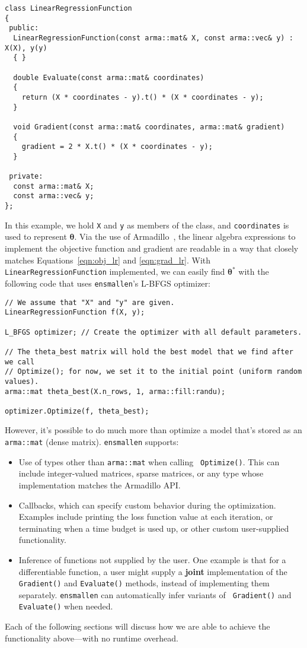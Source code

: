 \begin{verbatim}
class LinearRegressionFunction
{
 public:
  LinearRegressionFunction(const arma::mat& X, const arma::vec& y) : X(X), y(y)
  { }

  double Evaluate(const arma::mat& coordinates)
  {
    return (X * coordinates - y).t() * (X * coordinates - y);
  }

  void Gradient(const arma::mat& coordinates, arma::mat& gradient)
  {
    gradient = 2 * X.t() * (X * coordinates - y);
  }

 private:
  const arma::mat& X;
  const arma::vec& y;
};
\end{verbatim}

In this example, we hold {\tt \small X} and {\tt \small y} as members of the
class, and {\tt \small coordinates} is used to represent $\bm \theta$.  Via the
use of Armadillo~\cite{TODO}, the linear algebra expressions to implement the
objective function and gradient are readable in a way that closely matches
Equations~\ref{eqn:obj_lr} and \ref{eqn:grad_lr}.  With {\tt \small
LinearRegressionFunction} implemented, we can easily find $\bm \theta^*$ with
the following code that uses {\tt ensmallen}'s L-BFGS optimizer:

\begin{verbatim}
// We assume that "X" and "y" are given.
LinearRegressionFunction f(X, y);

L_BFGS optimizer; // Create the optimizer with all default parameters.

// The theta_best matrix will hold the best model that we find after we call
// Optimize(); for now, we set it to the initial point (uniform random values).
arma::mat theta_best(X.n_rows, 1, arma::fill:randu);

optimizer.Optimize(f, theta_best);
\end{verbatim}

However, it's possible to do much more than optimize a model that's stored as an
{\tt \small arma::mat} (dense matrix).  {\tt ensmallen} supports:

\begin{itemize}
  \item Use of types other than {\tt \small arma::mat} when calling {\tt \small
Optimize()}.  This can include integer-valued matrices, sparse matrices, or any
type whose implementation matches the Armadillo API.

  \item Callbacks, which can specify custom behavior during the optimization.
Examples include printing the loss function value at each iteration, or
terminating when a time budget is used up, or other custom user-supplied
functionality.

  \item Inference of functions not supplied by the user.  One example is that
for a differentiable function, a user might supply a {\bf joint} implementation
of the {\tt Gradient()} and {\tt Evaluate()} methods, instead of implementing
them separately.  {\tt ensmallen} can automatically infer variants of {\tt
Gradient()} and {\tt Evaluate()} when needed.
\end{itemize}

Each of the following sections will discuss how we are able to achieve the
functionality above---with no runtime overhead.
